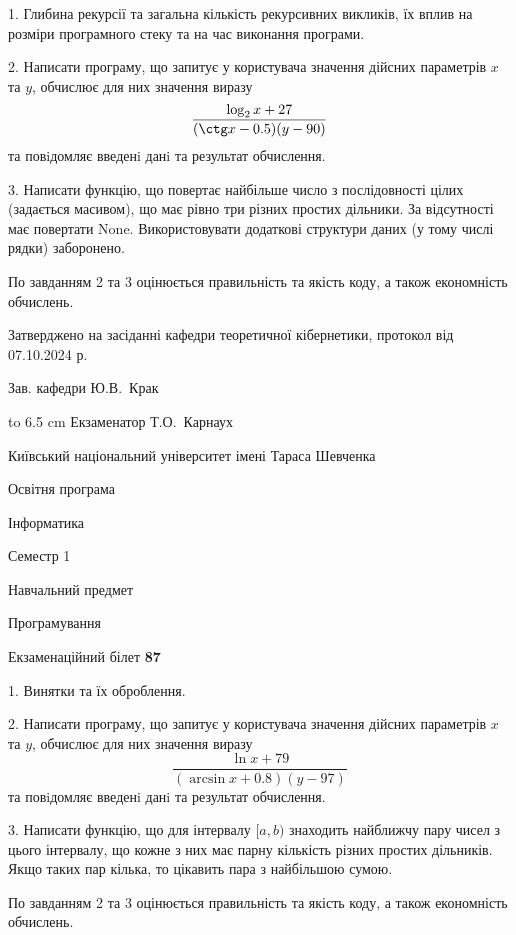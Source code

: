 \documentclass[12pt, ukrainian]{article}
\begin{document}
{%
1. Глибина рекурсії та загальна кількість рекурсивних викликів, їх вплив на розміри програмного стеку та на час виконання програми.%
\par
2. Написати програму, що запитує у користувача значення дійсних параметрів $x$ та $y$, обчислює для них значення виразу 
$$\frac{\log_{2} x + 27}{(\ctg x - 0.5) (y - 90)}$$ 
та повiдомляє введенi данi та результат обчислення.

\par
3. Написати функцію, що повертає найбільше число з послідовності цілих (задається масивом), що має рівно три різних простих дільники. За відсутності має повертати None. Використовувати додаткові структури даних (у тому числі рядки) заборонено.

По завданням 2 та 3 оцінюється правильність та якість коду, а також економність обчислень.

}
{\smallskip\smallskip \begin {scriptsize} Затверджено на засіданні кафедри теоретичної кібернетики, протокол   від   07.10.2024 р.\par\smallskip\smallskip\smallskip\smallskip
{\parbox {6.5 cm} {Зав. кафедри \dotfill Ю.В.~Крак}}\hspace {0.7cm} {\hbox to 6.5 cm { Екзаменатор \dotfill Т.О.~Карнаух}} \end{scriptsize}}
\vspace{0.9cm}
{{\begin {scriptsize}\par
{ \center  Київський національний університет імені Тараса Шевченка \par}
{\parbox {5 cm}{Освітня програма \hfill}{\parbox {7 cm}{Інформатика\hfill}}\parbox {6 cm}{\hfill Семестр 1}}\par
{\parbox {5 cm} {Навчальний предмет \hfill}\parbox {7 cm}{Програмування \hfill}\parbox {6cm}{\hfill}\par}\vspace{-15pt} \end{scriptsize}}{\center Екзаменаційний білет \No \textbf { 87 }\par}}
{%
1. Винятки та їх оброблення.%
\par
2. Написати програму, що запитує у користувача значення дійсних параметрів $x$ та $y$, обчислює для них значення виразу 
$$\frac{\ln x + 79}{(\arcsin x + 0.8) (y - 97)}$$ 
та повiдомляє введенi данi та результат обчислення.

\par
3. Написати функцію, що для інтервалу $[a, b)$ знаходить найближчу пару чисел з цього інтервалу, що кожне з них має парну кількість різних простих дільників. Якщо таких пар кілька, то цікавить пара з найбільшою сумою.

По завданням 2 та 3 оцінюється правильність та якість коду, а також економність обчислень.

}
\end{document}
